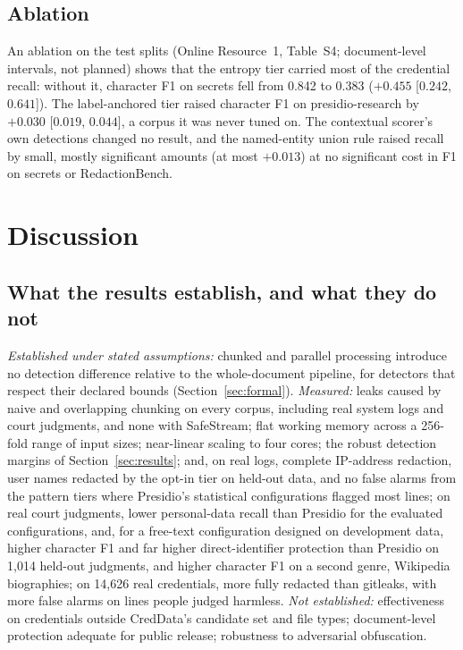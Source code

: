 \documentclass[pdflatex,sn-mathphys-num]{sn-jnl}
\theoremstyle{\ssThmStyle}
\theoremstyle{\ssDefStyle}
\begin{document}
\subsection{Ablation}\label{sec:ablation}
An ablation on the test splits (Online Resource~1, Table~S4; document-level intervals, not planned) shows that the entropy tier carried most of the credential recall: without it, character F1 on secrets fell from 0.842 to 0.383 ($+0.455$ [$0.242$, $0.641$]). The label-anchored tier raised character F1 on presidio-research by $+0.030$ [$0.019$, $0.044$], a corpus it was never tuned on. The contextual scorer's own detections changed no result, and the named-entity union rule raised recall by small, mostly significant amounts (at most $+0.013$) at no significant cost in F1 on secrets or RedactionBench.

\section{Discussion}\label{sec:discussion}

\subsection{What the results establish, and what they do not}
\emph{Established under stated assumptions:} chunked and parallel processing introduce no detection difference relative to the whole-document pipeline, for detectors that respect their declared bounds (Section~\ref{sec:formal}). \emph{Measured:} leaks caused by naive and overlapping chunking on every corpus, including real system logs and court judgments, and none with SafeStream; flat working memory across a 256-fold range of input sizes; near-linear scaling to four cores; the robust detection margins of Section~\ref{sec:results}; and, on real logs, complete IP-address redaction, user names redacted by the opt-in tier on held-out data, and no false alarms from the pattern tiers where Presidio's statistical configurations flagged most lines; on real court judgments, lower personal-data recall than Presidio for the evaluated configurations, and, for a free-text configuration designed on development data, higher character F1 and far higher direct-identifier protection than Presidio on 1,014 held-out judgments, and higher character F1 on a second genre, Wikipedia biographies; on 14,626 real credentials, more fully redacted than gitleaks, with more false alarms on lines people judged harmless. \emph{Not established:} effectiveness on credentials outside CredData's candidate set and file types; document-level protection adequate for public release; robustness to adversarial obfuscation.
\end{document}
